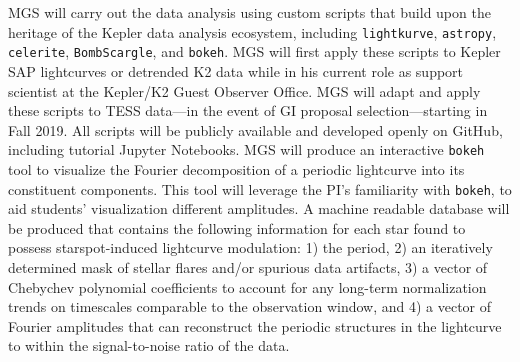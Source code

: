 \documentclass[letterpaper,11pt]{article}
\begin{document}
MGS will carry out the data analysis using custom scripts that build upon the heritage of the Kepler data analysis ecosystem, including \texttt{lightkurve}, \texttt{astropy}, \texttt{celerite}, \texttt{BombScargle}, and \texttt{bokeh}.  MGS will first apply these scripts to Kepler SAP lightcurves or detrended K2 data while in his current role as support scientist at the Kepler/K2 Guest Observer Office.  MGS will adapt and apply these scripts to TESS data---in the event of GI proposal selection---starting in Fall 2019.  All scripts will be publicly available and developed openly on GitHub, including tutorial Jupyter Notebooks.  MGS will produce an interactive \texttt{bokeh} tool to visualize the Fourier decomposition of a periodic lightcurve into its constituent components.  This tool will leverage the PI's familiarity with \texttt{bokeh}, to aid students' visualization different amplitudes.  A machine readable database will be produced that contains the following information for each star found to possess starspot-induced lightcurve modulation: 1) the period, 2) an iteratively determined mask of stellar flares and/or spurious data artifacts, 3) a vector of Chebychev polynomial coefficients to account for any long-term normalization trends on timescales comparable to the observation window, and 4) a vector of Fourier amplitudes that can reconstruct the periodic structures in the lightcurve to within the signal-to-noise ratio of the data.


\end{document}
